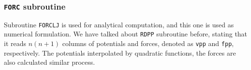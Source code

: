 
\subsubsection{\texttt{FORC} subroutine}
\label{sssec:forc}

Subroutine \texttt{FORCLJ} is used for analytical computation, and this one is
used as numerical formulation.
We have talked about \texttt{RDPP} subroutine before, stating that it reads
$n (n+1)$ columns of potentials and forces, denoted as \texttt{vpp} and
\texttt{fpp}, respectively.
The potentials interpolated by quadratic functions, the forces are also
calculated similar process.
